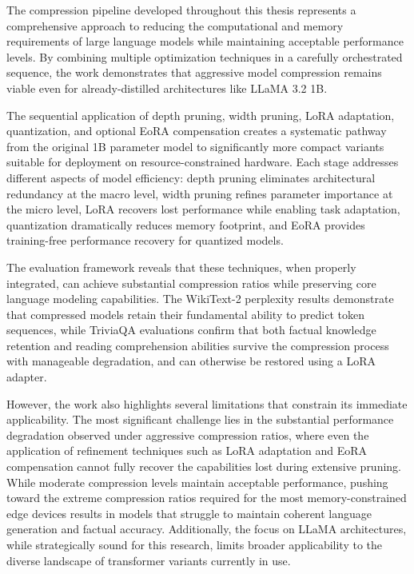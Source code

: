 
The compression pipeline developed throughout this thesis represents a comprehensive approach to reducing the computational and memory requirements of large language models while maintaining acceptable performance levels. By combining multiple optimization techniques in a carefully orchestrated sequence, the work demonstrates that aggressive model compression remains viable even for already-distilled architectures like LLaMA 3.2 1B.

The sequential application of depth pruning, width pruning, LoRA adaptation, quantization, and optional EoRA compensation creates a systematic pathway from the original 1B parameter model to significantly more compact variants suitable for deployment on resource-constrained hardware. Each stage addresses different aspects of model efficiency: depth pruning eliminates architectural redundancy at the macro level, width pruning refines parameter importance at the micro level, LoRA recovers lost performance while enabling task adaptation, quantization dramatically reduces memory footprint, and EoRA provides training-free performance recovery for quantized models.

The evaluation framework reveals that these techniques, when properly integrated, can achieve substantial compression ratios while preserving core language modeling capabilities. The WikiText-2 perplexity results demonstrate that compressed models retain their fundamental ability to predict token sequences, while TriviaQA evaluations confirm that both factual knowledge retention and reading comprehension abilities survive the compression process with manageable degradation, and can otherwise be restored using a LoRA adapter.

However, the work also highlights several limitations that constrain its immediate applicability. The most significant challenge lies in the substantial performance degradation observed under aggressive compression ratios, where even the application of refinement techniques such as LoRA adaptation and EoRA compensation cannot fully recover the capabilities lost during extensive pruning. While moderate compression levels maintain acceptable performance, pushing toward the extreme compression ratios required for the most memory-constrained edge devices results in models that struggle to maintain coherent language generation and factual accuracy. Additionally, the focus on LLaMA architectures, while strategically sound for this research, limits broader applicability to the diverse landscape of transformer variants currently in use.

